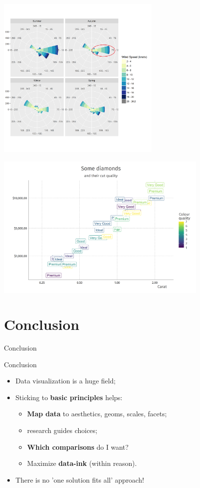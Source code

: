 \documentclass[xcolor=table,aspectratio=169]{beamer}
\begin{document}
\begin{frame}
  \includegraphics[width=0.6\textwidth]{pics/wind.png}
\end{frame}

\begin{frame}
	\includegraphics[width=0.78\textwidth]{pics/ggdiamonds.png}
\end{frame}

\section{Conclusion}


\begin{frame}


  Conclusion  
\end{frame}

\begin{frame}{Conclusion}

  \begin{itemize}
    \item Data visualization is a huge field;
    \item Sticking to \textbf{basic principles} helps:
      \begin{itemize}
      \item \textbf{Map data} to aesthetics, geoms, scales, facets;
    \item {} research  guides choices;
      \item \textbf{Which comparisons} do I want?
          \item Maximize \textbf{data-ink} (within reason).
          \end{itemize}
    \item There is no 'one solution fits all' approach!
  \end{itemize}
\end{frame}
\end{document}
